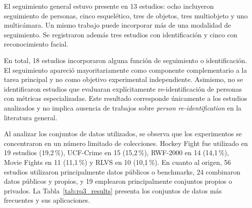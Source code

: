 \documentclass[pdflatex,sn-mathphys-num]{sn-jnl}%
\theoremstyle{thmstyleone}%
\theoremstyle{thmstyletwo}%
\theoremstyle{thmstylethree}%
\begin{document}
El seguimiento general estuvo presente en 13 estudios: ocho incluyeron seguimiento de personas, cinco esquelético, tres de objetos, tres multiobjeto y uno multicámara. Un mismo trabajo puede incorporar más de una modalidad de seguimiento. Se registraron además tres estudios con identificación y cinco con reconocimiento facial.

En total, 18 estudios incorporaron alguna función de seguimiento o identificación. El seguimiento apareció mayoritariamente como componente complementario
a la tarea principal y no como objetivo experimental independiente. Asimismo, no se
identificaron estudios que evaluaran explícitamente re-identificación de personas con
métricas especializadas. Este resultado corresponde únicamente a los estudios analizados y no implica ausencia de trabajos sobre
\textit{person re-identification} en la literatura general.

\FloatBarrier
Al analizar los conjuntos de datos utilizados, se observa que los experimentos se concentraron en un número limitado de colecciones.
Hockey Fight fue utilizado en 19 estudios (19,2\,\%), UCF-Crime en 15
(15,2\,\%), RWF-2000 en 14 (14,1\,\%), Movie Fights en 11 (11,1\,\%)
y RLVS en 10 (10,1\,\%). En cuanto al origen, 56 estudios utilizaron
principalmente datos públicos o benchmarks, 24 combinaron datos públicos y propios,
y 19 emplearon principalmente conjuntos propios o privados. La Tabla~\ref{tab:rq3_results}
presenta los conjuntos de datos más frecuentes y sus aplicaciones.
\end{document}
